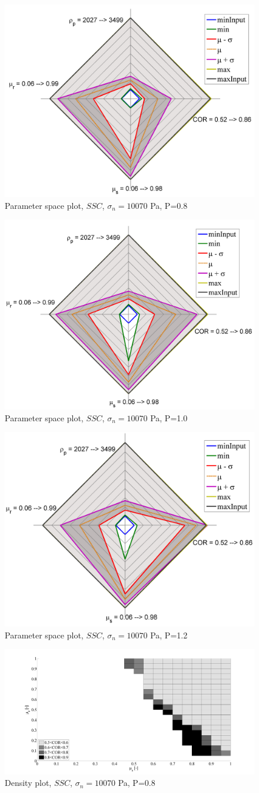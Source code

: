 \begin{figure}%
\centering 
\includegraphics[width=.48\columnwidth]{images/26radarpirker08schulze10070} 
\caption{Parameter space plot, $SSC$, $\sigma_n=10070$ Pa, P=0.8}
\label{fig:26radarpirker08schulze10070} 
\end{figure}
\begin{figure}%
\centering 
\includegraphics[width=.48\columnwidth]{images/24radarpirker1schulze10070} 
\caption{Parameter space plot, $SSC$, $\sigma_n=10070$ Pa, P=1.0}
\label{fig:24radarpirker1schulze10070} 
\end{figure}
\begin{figure}%
\centering 
\includegraphics[width=.48\columnwidth]{images/28radarpirker12schulze10070} 
\caption{Parameter space plot, $SSC$, $\sigma_n=10070$ Pa, P=1.2}
\label{fig:28radarpirker12schulze10070} 
\end{figure}
\begin{figure}%
\centering 
\includegraphics[width=.48\columnwidth]{images/27cloudpirker08schulze10070} 
\caption{Density plot, $SSC$, $\sigma_n=10070$ Pa, P=0.8}
\label{fig:27cloudpirker08schulze10070} 
\end{figure}
